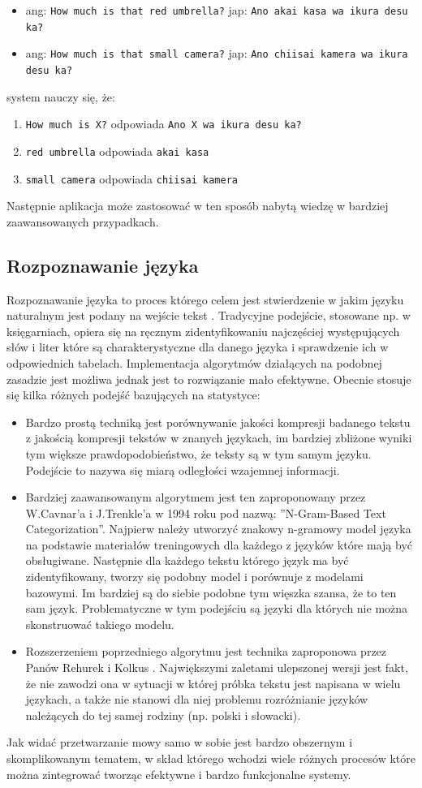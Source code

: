  \begin{itemize}
	\item ang: \verb"How much is that red umbrella?" jap: \verb"Ano akai kasa wa ikura desu ka?"
	\item ang: \verb"How much is that small camera?" jap: \verb"Ano chiisai kamera wa ikura desu ka?"
\end{itemize} 
system nauczy się, że:
 \begin{enumerate}
	\item \verb"How much is X?" odpowiada \verb"Ano X wa ikura desu ka?"
	\item \verb"red umbrella" odpowiada \verb"akai kasa"
	\item \verb"small camera" odpowiada \verb"chiisai kamera"
\end{enumerate} 
Następnie aplikacja może zastosować w ten sposób nabytą wiedzę w bardziej zaawansowanych przypadkach.
\subsection{Rozpoznawanie języka}
Rozpoznawanie języka to proces którego celem jest stwierdzenie w jakim języku naturalnym jest podany na wejście tekst \cite{adamsresnik1997} . Tradycyjne podejście, stosowane np. w księgarniach, opiera się na ręcznym zidentyfikowaniu najczęściej występujących słów i liter które są charakterystyczne dla danego języka i sprawdzenie ich w odpowiednich tabelach. Implementacja algorytmów działących na podobnej zasadzie jest możliwa jednak jest to rozwiązanie mało efektywne. Obecnie stosuje się kilka różnych podejść bazujących na statystyce:
 \begin{itemize}
	\item Bardzo prostą techniką jest porównywanie jakości kompresji badanego tekstu z jakością kompresji tekstów w znanych językach, im bardziej zbliżone wyniki tym większe prawdopodobieństwo, że teksty są w tym samym języku. Podejście to nazywa się miarą odległości wzajemnej informacji.
	\item Bardziej zaawansowanym algorytmem jest ten zaproponowany przez W.Cavnar'a i J.Trenkle'a w 1994 roku pod nazwą: ''N-Gram-Based Text Categorization''. Najpierw należy utworzyć znakowy n-gramowy model języka na podstawie materiałów treningowych dla każdego z języków które mają być obsługiwane. Następnie dla każdego tekstu którego język ma być zidentyfikowany, tworzy się podobny model i porównuje z modelami bazowymi. Im bardziej są do siebie podobne tym więszka szansa, że to ten sam język. Problematyczne w tym podejściu są języki dla których nie można skonstruować takiego modelu. 
	\item Rozszerzeniem poprzedniego algorytmu jest technika zaproponowa przez Panów Rehurek i Kolkus \cite{rehurek2009} . Największymi zaletami ulepszonej wersji jest fakt, że nie zawodzi ona w sytuacji w której próbka tekstu jest napisana w wielu językach, a także nie stanowi dla niej problemu rozróżnianie języków należących do tej samej rodziny (np. polski i słowacki). 
\end{itemize} 
Jak widać przetwarzanie mowy samo w sobie jest bardzo obszernym i skomplikowanym tematem, w skład którego wchodzi wiele różnych procesów które można zintegrować tworząc efektywne i bardzo funkcjonalne systemy.

